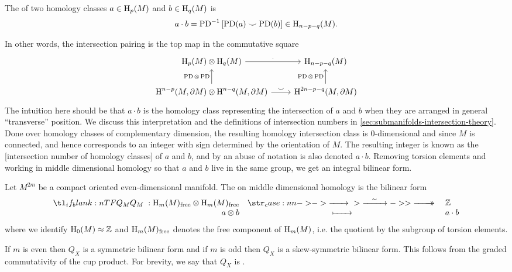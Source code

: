 \begin{definition}
	The  of two homology classes $a\in \operatorname{H}_p(M)$ and $b\in \operatorname{H}_q(M)$ is
	\[
		a\cdot b = \mathrm{PD}^{-1}\left[\mathrm{PD}(a)\smile \mathrm{PD}(b)\right]\in \operatorname{H}_{n-p-q}(M).
	\]
\end{definition}
In other words, the intersection pairing is the top map in the commutative square 
\[
	\begin{tikzcd}
		{\H_p(M)\otimes \H_q(M)} & {\H_{n-p-q}(M)} \\
		{\H^{n-p}(M, \partial M)\otimes \H^{n-q}(M,\partial M)} & {\H^{2n-p-q}(M,\partial M)}
		\arrow["\tnsv", from=1-1, to=1-2]
		\arrow["\mathrm{PD}\,\otimes\,\mathrm{PD}", from=2-1, to=1-1]
		\arrow["\mathrm{PD}\,\otimes\,\mathrm{PD}",from=2-2, to=1-2]
		\arrow["\smile", from=2-1, to=2-2]
	\end{tikzcd}
\]
The intuition here should be that $a\cdot b$ is the homology class representing the intersection of $a$ and $b$ when they are arranged in general ``transverse'' position. We discuss this interpretation and the definitions of intersection numbers in \cref{sec:submanifolds-intersection-theory}.
Done over homology classes of complementary dimension, the resulting homology intersection class is 0-dimensional and since $M$ is connected, and hence corresponds to an integer with sign determined by the orientation of $M$. The resulting integer is known as the [intersection number of homology classes] of $a$ and $b$, and by an abuse of notation is also denoted $a\cdot b$.
Removing torsion elements and working in middle dimensional homology so that $a$ and $b$ live in the same group, we get an integral bilinear form.

\begin{definition}
	Let $M^{2m}$ be a compact oriented even-dimensional manifold. The  on middle dimensional homology is the bilinear form
	\begin{equation}
		\lkxfunc{Q_M}{\H_m(M)_{\mathrm{free}}\otimes \H_m(M)_{\mathrm{free}}}{\Z}{a\otimes b}{a \tnsv b}
	\end{equation}
	where we identify $\operatorname{H}_0(M)\approx \mathbb{Z}$ and $\operatorname{H}_m(M)_{\mathrm{free}}$ denotes the free component of $\operatorname{H}_m(M)$, i.e. the quotient by the subgroup of torsion elements.
\end{definition}

\begin{remark*}
	If $m$ is even then $Q_X$ is a symmetric bilinear form and if $m$ is odd then $Q_X$ is a skew-symmetric bilinear form. This follows from the graded commutativity of the cup product. For brevity, we say that $Q_X$ is .
\end{remark*}

